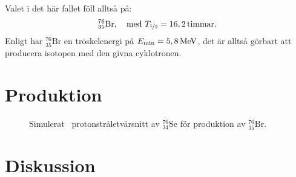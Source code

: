 \documentclass[11pt,a4paper, german, english, swedish
]{article}
\newcommand{\Thalv}{\ifmmode{T_{\nicefrac{1}{2}}}\else$T_{\nicefrac{1}{2}}$\fi}
\begin{document}
Valet i det här fallet föll alltså på:
\[
^{76}_{35}\mathrm{Br}\qcomma \text{med } \Thalv=\unit[16,2]{timmar}.
\]
Enligt \cite{PingPong} har $^{76}_{35}\mathrm{Br}$ en tröskelenergi på $E_\text{min}=\unit[5,8]{MeV}$, det är alltså görbart att producera isotopen med den givna cyklotronen.

\section{Produktion}


\begin{figure}\centering

\caption{Simulerat~\cite{PingPong} protonstråletvärsnitt av $^{76}_{34}\mathrm{Se}$ för produktion av $^{76}_{35}\mathrm{Br}$.}
\label{fig:x-sect}
\end{figure}


\section{Diskussion}



\newpage

\end{document}
